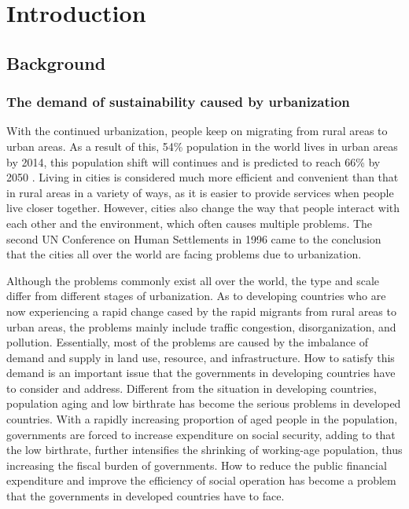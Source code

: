 \chapter{Introduction}

%
\section{Background}

\subsection{The demand of sustainability caused by urbanization}
With the continued urbanization, people keep on migrating from rural areas to urban areas. As a result of this, 54\% population in the world lives in urban areas by 2014, this population shift will continues and is predicted to reach 66\% by 2050 \cite{un2014world}. Living in cities is considered much more efficient and convenient than that in rural areas in a variety of ways, as it is easier to provide services when people live closer together. However, cities also change the way that people interact with each other and the environment, which often causes multiple problems. The second UN Conference on Human Settlements in 1996 came to the conclusion that the cities all over the world are facing problems due to urbanization.

Although the problems commonly exist all over the world, the type and scale differ from different stages of urbanization. As to developing countries who are now experiencing a rapid change cased by the rapid migrants from rural areas to urban areas, the problems mainly include traffic congestion, disorganization, and pollution. Essentially, most of the problems are caused by the imbalance of demand and supply in land use, resource, and infrastructure. How to satisfy this demand is an important issue that the governments in developing countries have to consider and address. Different from the situation in developing countries, population aging and low birthrate has become the serious problems in developed countries. With a rapidly increasing proportion of aged people in the population, governments are forced to increase expenditure on social security, adding to that the low birthrate, further intensifies the shrinking of working-age population, thus increasing the fiscal burden of governments. How to reduce the public financial expenditure and improve the efficiency of social operation has become a problem that the governments in developed countries have to face. 

